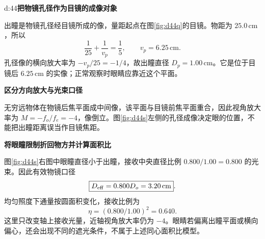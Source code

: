 \begin{drillsolution}{d:44}\textbf{把物镜孔径作为目镜的成像对象}\par\nobreak
出瞳是物镜孔径经目镜所成的像，量距起点在图\ref{fig:d44q}的目镜。物距为 $25.0\,\mathrm{cm}$，所以
\[
\frac1{25}+\frac1{v_p}=\frac15,
\qquad \boxed{v_p=6.25\,\mathrm{cm}}.
\]
孔径像的横向放大率为 $-v_p/25=-1/4$，故出瞳直径 $\boxed{D_p=1.00\,\mathrm{cm}}$。它是位于目镜后 $6.25\,\mathrm{cm}$ 的实像；正常观察时眼睛应靠近这个平面。

\par\medskip{}\noindent\textbf{区分方向放大与光束口径}\par\nobreak
无穷远物体在物镜后焦平面成中间像，该平面与目镜前焦平面重合，因此视角放大率为 $\boxed{M=-f_o/f_e=-4}$，像倒立。图\ref{fig:d44s}左侧的孔径成像决定眼的位置，不能把出瞳距离误当作目镜焦距。

\par\medskip{}\noindent\textbf{将眼瞳限制折回物方并计算面积比}\par\nobreak
图\ref{fig:d44s}右图中眼瞳直径小于出瞳，接收中央直径比例 $0.800/1.00=0.800$ 的光束。因此有效物镜口径
\[
\boxed{D_{\rm eff}=0.800D_o=3.20\,\mathrm{cm}}.
\]
均匀照度下通量按圆面积变化，接收比例为
\[
\boxed{\eta=(0.800/1.00)^2=0.640}.
\]
这里只改变轴上接收光量，近轴视角放大率仍为 $-4$。眼睛若偏离出瞳平面或横向偏心，还会出现不同的遮光条件，不属于上述同心面积比模型。
\end{drillsolution}

